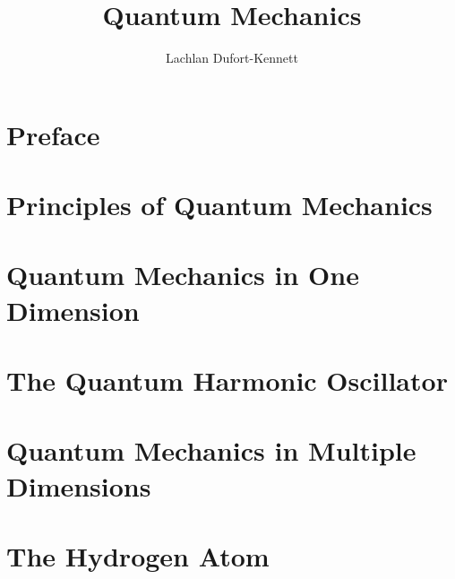 \documentclass{lecture-notes}
\title{Quantum Mechanics}
\author{Lachlan Dufort-Kennett}
\begin{document}
    \frontmatter
    \maketitle
    \tableofcontents

    \chapter{Preface}\label{chap:preface}

    \mainmatter
    \chapter{Principles of Quantum Mechanics}\label{chap:principles}
    
    \chapter{Quantum Mechanics in One Dimension}\label{chap:one-dimension}
    
    \chapter{The Quantum Harmonic Oscillator}\label{chap:quantum-harmonic-oscillator}
    
    \chapter{Quantum Mechanics in Multiple Dimensions}\label{chap:multiple-dimensions}
    
    
    \chapter{The Hydrogen Atom}\label{chap:the-hydrogen-atom}
    

    \backmatter
    \nocite{*}
    
    \label{bibliography}
\end{document}
